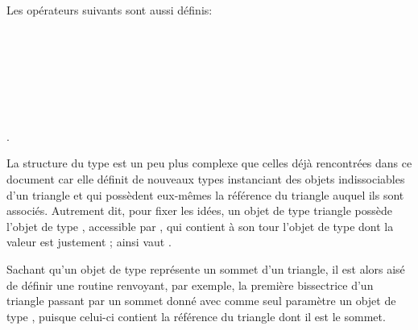 \documentclass[pdftex]{article}
\begin{document}
Les opérateurs suivants sont aussi définis:\\
\\
\\
\\
\\
\\
\\
\\
.

La structure du type  est un peu plus complexe que
celles déjà rencontrées dans ce document car elle définit
de nouveaux types instanciant des objets indissociables
d'un triangle et qui possèdent eux-mêmes la référence du triangle
auquel ils sont associés. Autrement dit, pour fixer les idées, un
objet  de type triangle possède l'objet  de
type , accessible par , qui contient à son
tour l'objet  de type  dont la valeur est
justement ; ainsi  vaut .

Sachant qu'un objet de type 
représente un sommet d'un triangle, il est alors aisé de définir une
routine renvoyant, par exemple, la première bissectrice d'un triangle
passant par un sommet donné avec comme seul paramètre un objet de type
, puisque celui-ci contient la référence du triangle dont
il est le sommet.
\end{document}
